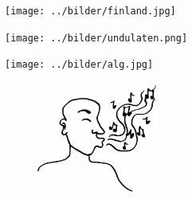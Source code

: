 \begin{intersong}
\begin{center}
\texttt{[image: ../bilder/finland.jpg]} 
\end{center}
\end{intersong}
\sclearpage

\sclearpage

\sclearpage

\begin{intersong}
\begin{center}
\texttt{[image: ../bilder/undulaten.png]} 
\end{center}
\end{intersong}
\sclearpage

\sclearpage

\sclearpage



\begin{intersong}
\begin{center}
\texttt{[image: ../bilder/alg.jpg]} 
\end{center}
\end{intersong}
\clearpage

\clearpage

\clearpage

\clearpage

\clearpage

\clearpage


%
\clearpage
\begin{figure}[h]
	\begin{center}
		\includegraphics[width=40mm]{../bilder/fardigabilder/BilderTillKapitel/visslaren.png} 
	\end{center}
\end{figure}
